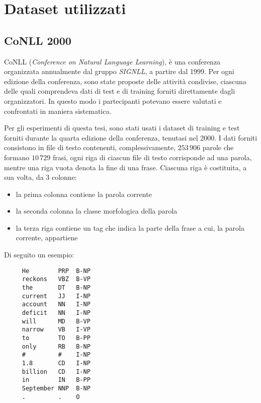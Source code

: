 \section{Dataset utilizzati}
\nocite{Zanchetta:2005}
\nocite{Attardi:2008}

\subsection{CoNLL 2000}
CoNLL (\emph{Conference on Natural Language Learning}), \`e una conferenza organizzata annualmente dal gruppo \emph{SIGNLL}, a partire dal 1999.
Per ogni edizione della conferenza, sono state proposte delle attivit\`a condivise, ciascuna delle quali comprendeva dati di test e di training forniti direttamente dagli organizzatori.
In questo modo i partecipanti potevano essere valutati e confrontati in maniera sistematica.

Per gli esperimenti di questa tesi, sono stati usati i dataset di training e test forniti durante la quarta edizione della conferenza, tenutasi nel 2000.
I dati forniti consistono in file di testo contenenti, complessivamente, $253\,906$ parole che formano $10\,729$ frasi, ogni riga di ciascun file di testo corrisponde ad una parola, mentre una riga vuota denota la fine di una frase.
Ciascuna riga \`e costituita, a sua volta, da 3 colonne:
\begin{itemize}
  \item la prima colonna contiene la parola corrente
  \item la seconda colonna la classe morfologica della parola
  \item la terza riga contiene un tag che indica la parte della frase a cui, la parola corrente, appartiene
\end{itemize}

Di seguito un esempio:

\begin{center}
  \begin{minipage}{5cm}
    \begin{verbatim}
     He        PRP  B-NP
     reckons   VBZ  B-VP
     the       DT   B-NP
     current   JJ   I-NP
     account   NN   I-NP
     deficit   NN   I-NP
     will      MD   B-VP
     narrow    VB   I-VP
     to        TO   B-PP
     only      RB   B-NP
     #         #    I-NP
     1.8       CD   I-NP
     billion   CD   I-NP
     in        IN   B-PP
     September NNP  B-NP
     .         .    O
    \end{verbatim}
  \end{minipage}
\end{center}

